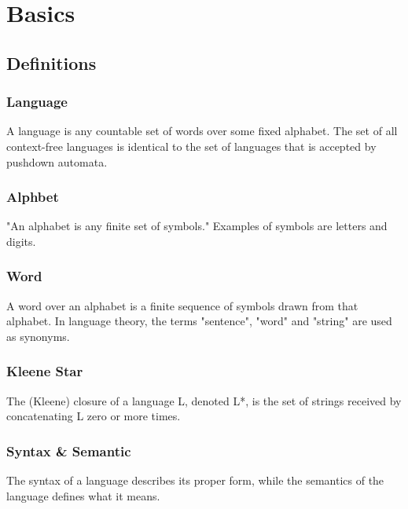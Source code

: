 \chapter{Basics}
\label{cha:basics}
\section{Definitions}
\subsection{Language}
A language is any countable set of words over some fixed alphabet. The set of all context-free languages is identical to the set of languages that is accepted by pushdown automata.\cite{DragonBook}

\subsection{Alphbet}
"An alphabet is any finite set of symbols." Examples of symbols are letters and digits.\cite{DragonBook}

\subsection{Word} 
A word over an alphabet is a finite sequence of symbols drawn from that alphabet. In language theory, the terms "sentence", "word" and "string" are used as synonyms.\cite{DragonBook}

\subsection{Kleene Star} 
The (Kleene) closure of a language L, denoted L*, is the set of strings received by concatenating L zero or more times. \cite{DragonBook}


\subsection{Syntax \& Semantic}  
The syntax of a language describes its proper form, while the semantics of the language defines what it means. \cite{DragonBook}


